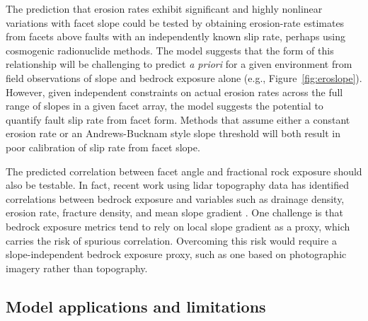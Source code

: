 The prediction that erosion rates exhibit significant and highly nonlinear variations with facet slope could be tested by obtaining erosion-rate estimates from facets above faults with an independently known slip rate, perhaps using cosmogenic radionuclide methods. The model suggests that the form of this relationship will be challenging to predict \textit{a priori} for a given environment from field observations of slope and bedrock exposure alone (e.g., Figure~\ref{fig:eroslope}). However, given independent constraints on actual erosion rates across the full range of slopes in a given facet array, the model suggests the potential to quantify fault slip rate from facet form. Methods that assume either a constant erosion rate or an Andrews-Bucknam style slope threshold will both result in poor calibration of slip rate from facet slope. %

The predicted correlation between facet angle and fractional rock exposure should also be testable. In fact, recent work using lidar topography data has identified correlations between bedrock exposure and variables such as drainage density, erosion rate, fracture density, and mean slope gradient  \citep{dibiase2012hillslope,dibiase2018fracture,rossi2020orographic}. One challenge is that bedrock exposure metrics tend to rely on local slope gradient as a proxy, which carries the risk of spurious correlation. Overcoming this risk would require a slope-independent bedrock exposure proxy, such as one based on photographic imagery rather than topography.



\subsection{Model applications and limitations}


